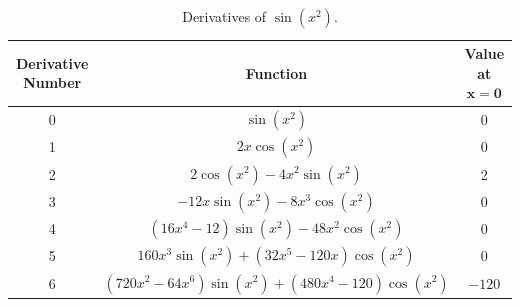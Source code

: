\documentclass{article}
\begin{document}
\begin{table}[h!]
    \centering
    \begin{tabular}{|c|c|c|}
        \hline
        \textbf{Derivative Number} & \textbf{Function} & \textbf{Value at }$\mathbf{x=0}$\\
        \hline
        0 & $\sin(x^2)$ & 0\\
        \hline
        1 & $2x\cos(x^2)$ & 0\\
        \hline
        2 & $2\cos(x^2)-4x^2\sin(x^2)$ & 2\\
        \hline
        3 & $-12x\sin(x^2)-8x^3\cos(x^2)$ & 0\\
        \hline
        4 & $(16x^4-12)\sin(x^2)-48x^2\cos(x^2)$ & 0\\
        \hline
        5 & $160x^3\sin(x^2)+(32x^5-120x)\cos(x^2)$ & 0\\
        \hline
        6 & $(720x^2-64x^6)\sin(x^2)+(480x^4-120)\cos(x^2)$ & $-120$\\
        \hline
    \end{tabular}
    \caption{Derivatives of $\sin(x^2)$.}
    \label{tab:2}
\end{table}
\end{document}
